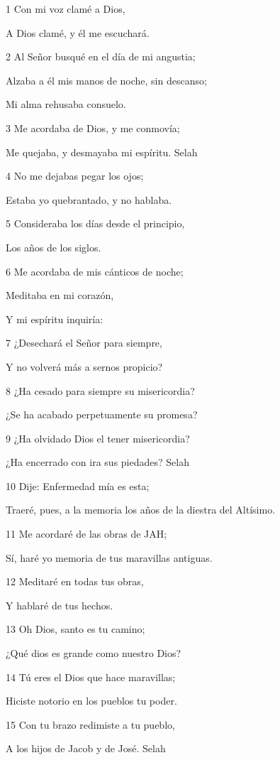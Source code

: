 \par 1 Con mi voz clamé a Dios,
\par A Dios clamé, y él me escuchará.
\par 2 Al Señor busqué en el día de mi angustia;
\par Alzaba a él mis manos de noche, sin descanso;
\par Mi alma rehusaba consuelo.
\par 3 Me acordaba de Dios, y me conmovía;
\par Me quejaba, y desmayaba mi espíritu. Selah
\par 4 No me dejabas pegar los ojos;
\par Estaba yo quebrantado, y no hablaba.
\par 5 Consideraba los días desde el principio,
\par Los años de los siglos.
\par 6 Me acordaba de mis cánticos de noche;
\par Meditaba en mi corazón,
\par Y mi espíritu inquiría:
\par 7 ¿Desechará el Señor para siempre,
\par Y no volverá más a sernos propicio?
\par 8 ¿Ha cesado para siempre su misericordia?
\par ¿Se ha acabado perpetuamente su promesa?
\par 9 ¿Ha olvidado Dios el tener misericordia?
\par ¿Ha encerrado con ira sus piedades? Selah
\par 10 Dije: Enfermedad mía es esta;
\par Traeré, pues, a la memoria los años de la diestra del Altísimo.
\par 11 Me acordaré de las obras de JAH;
\par Sí, haré yo memoria de tus maravillas antiguas.
\par 12 Meditaré en todas tus obras,
\par Y hablaré de tus hechos.
\par 13 Oh Dios, santo es tu camino;
\par ¿Qué dios es grande como nuestro Dios?
\par 14 Tú eres el Dios que hace maravillas;
\par Hiciste notorio en los pueblos tu poder.
\par 15 Con tu brazo redimiste a tu pueblo,
\par A los hijos de Jacob y de José. Selah
